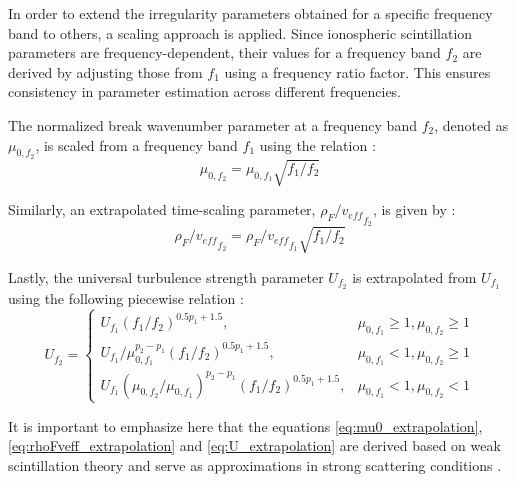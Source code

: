 In order to extend the irregularity parameters obtained for a specific frequency band to others, a scaling approach is applied. Since ionospheric scintillation parameters are frequency-dependent, their values for a frequency band $f_2$ are derived by adjusting those from $f_1$ using a frequency ratio factor. This ensures consistency in parameter estimation across different frequencies.

The normalized break wavenumber parameter at a frequency band $f_2$, denoted as $\mu_{0,f_2}$, is scaled from a frequency band $f_1$ using the relation \cite[Equation 17]{JiaoScintillationOnGPSSignalsForDynamicPlatforms2018}:
\begin{equation}
    \label{eq:mu0_extrapolation}
    \mu_{0,f_2} = \mu_{0,f_1} \sqrt{f_1 / f_2}
\end{equation}

Similarly, an extrapolated time-scaling parameter, ${\rho_F / v_{eff}}_{f_2}$, is given by \cite[Equation 18]{JiaoScintillationOnGPSSignalsForDynamicPlatforms2018}:
\begin{equation}
    \label{eq:rhoFveff_extrapolation}
    {\rho_F / v_{eff}}_{f_2} = {\rho_F / v_{eff}}_{f_1} \sqrt{f_1 / f_2}
\end{equation}

Lastly, the universal turbulence strength parameter $U_{f_2}$ is extrapolated from $U_{f_1}$ using the following piecewise relation \cite[Equation 19]{JiaoScintillationOnGPSSignalsForDynamicPlatforms2018}:
\begin{equation}
    \label{eq:U_extrapolation}
    U_{f_2} =
    \begin{cases} 
        U_{f_1} \left(f_1 / f_2\right)^{0.5p_1 + 1.5}, &\mu_{0,f_1} \geq 1, \mu_{0,f_2} \geq 1 \\
        U_{f_1} / \mu_{0,f_1}^{p_2-p_1} \left( f_1 / f_2 \right)^{0.5 p_1 + 1.5}, & \mu_{0,f_1} < 1, \mu_{0,f_2} \geq 1 \\
        U_{f_1} \left( \mu_{0,f_2} / \mu_{0,f_1} \right)^{p_2 - p_1} \left(f_1 / f_2\right)^{0.5 p_1 + 1.5}, & \mu_{0,f_1} < 1, \mu_{0,f_2} < 1
    \end{cases}
\end{equation}

It is important to emphasize here that the equations \eqref{eq:mu0_extrapolation}, \eqref{eq:rhoFveff_extrapolation} and \eqref{eq:U_extrapolation} are derived based on weak scintillation theory and serve as approximations in strong scattering conditions \cite{Rino1979WeakScatter}.

